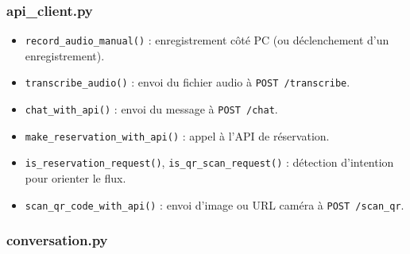 \documentclass[12pt,a4paper]{article}
\begin{document}
\subsubsection{api\_client.py}

\begin{itemize}[noitemsep]
  \item \texttt{record\_audio\_manual()} : enregistrement côté PC (ou déclenchement d'un enregistrement).
  \item \texttt{transcribe\_audio()} : envoi du fichier audio à \texttt{POST /transcribe}.
  \item \texttt{chat\_with\_api()} : envoi du message à \texttt{POST /chat}.
  \item \texttt{make\_reservation\_with\_api()} : appel à l'API de réservation.
  \item \texttt{is\_reservation\_request()}, \texttt{is\_qr\_scan\_request()} : détection d'intention pour orienter le flux.
  \item \texttt{scan\_qr\_code\_with\_api()} : envoi d'image ou URL caméra à \texttt{POST /scan\_qr}.
\end{itemize}

\subsubsection{conversation.py}
\end{document}

